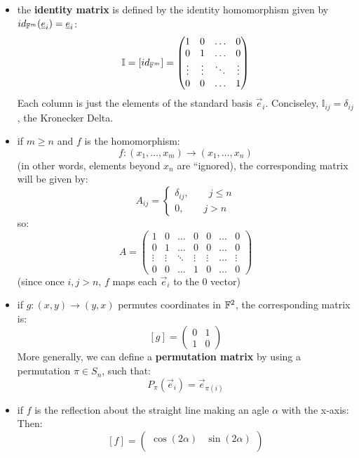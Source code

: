\documentclass{exam}
\begin{document}
\begin{itemize}
    \item the \textbf{identity matrix} is defined by the identity homomorphism given by $id_{\mathbb{F}^m}(\underline{e}_i) = \underline{e}_i$:
    \[
    \mathbb{I} = [id_{\mathbb{F}^m}] = \begin{pmatrix}
    1 & 0 & \ldots & 0 \\
    0 & 1 & \ldots & 0 \\
    \vdots & \vdots & \ddots & \vdots \\
    0 & 0 & \ldots & 1
    \end{pmatrix}
    \]
    Each column is just the elements of the standard basis $\vec{e}_i$.
    Conciseley, $\mathbb{I}_{ij} = \delta_{ij}$, the Kronecker Delta.
    \item if $m \geq n$ and $f$ is the homomorphism:
    \[
    f : (x_1, \ldots, x_m) \to (x_1, \ldots, x_n)
    \]
    (in other words, elements beyond $x_n$ are ``ignored), the corresponding matrix will be given by:
    \[
    A_{ij} = \begin{cases}
    \delta_{ij}, \qquad j \leq n \\
    0, \qquad j > n
    \end{cases}
    \]
    so:
    \[
    A = \begin{pmatrix}
    1 & 0 & \ldots & 0 & 0 & \ldots & 0 \\
    0 & 1 & \ldots & 0 & 0 & \ldots & 0\\
    \vdots & \vdots & \ddots & \vdots & \vdots & \ldots & \vdots \\
    0 & 0 & \ldots & 1 & 0 & \ldots & 0
    \end{pmatrix}
    \]
    (since once $i,j > n$, $f$ maps each $\vec{e}_i$ to the 0 vector)
    \item if $g : (x,y) \to (y,x)$ permutes coordinates in $\mathbb{F}^2$, the corresponding matrix is:
    \[
    [g] = \begin{pmatrix}
    0 & 1 \\
    1 & 0
    \end{pmatrix}
    \]
    More generally, we can define a \textbf{permutation matrix} by using a permutation $\pi \in S_n$, such that:
    \[
    P_\pi(\vec{e}_i) = \vec{e}_{\pi(i)}
    \]
    \pagebreak
    \item if $f$ is the reflection about the straight line making an agle $\alpha$ with the x-axis:
    Then:
    \[
    [f] = \begin{pmatrix}
    \cos(2\alpha) & \sin(2\alpha) \\

\end{pmatrix}\]
\end{itemize}
\end{document}
